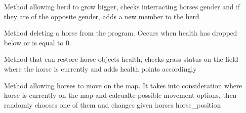 \documentclass[letterpaper,10pt,english]{sphinxmanual}
\begin{document}
\begin{fulllineitems}
\begin{fulllineitems}
\label{\detokenize{main_package:main_package.Horse.Horse.breed}}
\pysigstartsignatures
{}
\pysigstopsignatures
\sphinxAtStartPar
Method allowing herd to grow bigger, checks interracting horses gender and if they are of the opposite gender,
adds a new member to the herd

\end{fulllineitems}


\begin{fulllineitems}
\label{\detokenize{main_package:main_package.Horse.Horse.death}}
\pysigstartsignatures
{}
\pysigstopsignatures
\sphinxAtStartPar
Method deleting a horse from the program. Occurs when health has dropped below or is equal to 0.

\end{fulllineitems}


\begin{fulllineitems}
\label{\detokenize{main_package:main_package.Horse.Horse.eat}}
\pysigstartsignatures
{}
\pysigstopsignatures
\sphinxAtStartPar
Method that can restore horse objects health, checks grass status on the field where the horse is currently
and adds health points accordingly

\end{fulllineitems}


\begin{fulllineitems}
\label{\detokenize{main_package:main_package.Horse.Horse.move}}
\pysigstartsignatures
{}
\pysigstopsignatures
\sphinxAtStartPar
Method allowing horses to move on the map. It takes into consideration where horse is currently on the map
and calcualte possible movement options, then randomly chooses one of them and changes given horses horse\_position

\end{fulllineitems}


\end{fulllineitems}
\end{document}

